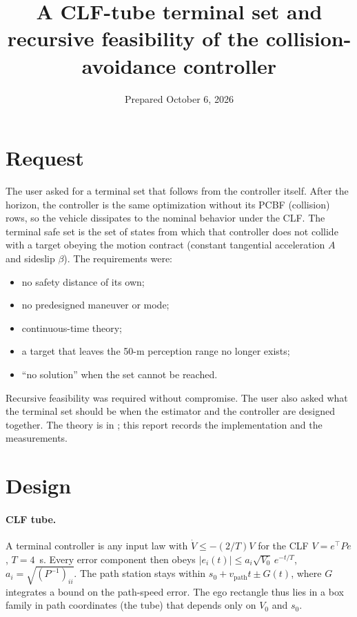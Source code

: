 \documentclass[11pt]{article}
\title{A CLF-tube terminal set and recursive feasibility of the collision-avoidance controller}
\date{Prepared October 6, 2026}
\begin{document}
\maketitle

\section{Request}
The user asked for a terminal set that follows from the controller itself.
After the horizon, the controller is the same optimization without its PCBF
(collision) rows, so the vehicle dissipates to the nominal behavior under the
CLF. The terminal safe set is the set of states from which that controller
does not collide with a target obeying the motion contract (constant
tangential acceleration $A$ and sideslip $\beta$). The requirements were:
\begin{itemize}
\item no safety distance of its own;
\item no predesigned maneuver or mode;
\item continuous-time theory;
\item a target that leaves the 50-m perception range no longer exists;
\item ``no solution'' when the set cannot be reached.
\end{itemize}
Recursive feasibility was required without compromise. The user also asked
what the terminal set should be when the estimator and the controller are
designed together. The theory is in ;
this report records the implementation and the measurements.

\section{Design}
\paragraph{CLF tube.} A terminal controller is any input law with
$\dot V\le-(2/T)V$ for the CLF $V=e^\top Pe$, $T=4$~s. Every error component
then obeys
$|e_i(t)|\le a_i\sqrt{V_0}\,e^{-t/T}$, $a_i=\sqrt{(P^{-1})_{ii}}$. The path
station stays within $s_0+v_{\mathrm{path}}t\pm G(t)$, where $G$ integrates a
bound on the path-speed error. The ego rectangle thus lies in a box family in
path coordinates (the tube) that depends only on $V_0$ and $s_0$.
\end{document}
